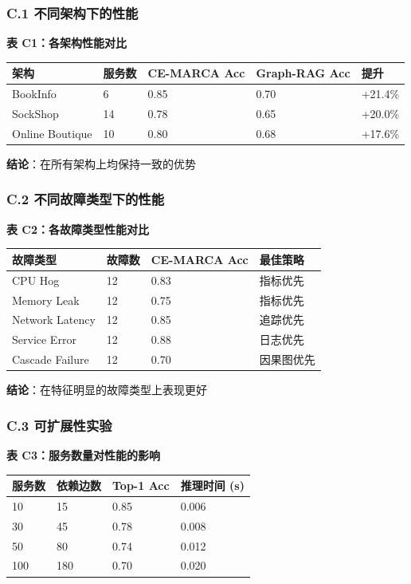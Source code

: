 \hypertarget{c.1-ux4e0dux540cux67b6ux6784ux4e0bux7684ux6027ux80fd}{%
\subsubsection{C.1
不同架构下的性能}\label{c.1-ux4e0dux540cux67b6ux6784ux4e0bux7684ux6027ux80fd}}

\textbf{表 C1：各架构性能对比}

\begin{longtable}[]{@{}lllll@{}}
\toprule
架构 & 服务数 & CE-MARCA Acc & Graph-RAG Acc & 提升\tabularnewline
\midrule
\endhead
BookInfo & 6 & 0.85 & 0.70 & +21.4\%\tabularnewline
SockShop & 14 & 0.78 & 0.65 & +20.0\%\tabularnewline
Online Boutique & 10 & 0.80 & 0.68 & +17.6\%\tabularnewline
\bottomrule
\end{longtable}

\textbf{结论}：在所有架构上均保持一致的优势

\hypertarget{c.2-ux4e0dux540cux6545ux969cux7c7bux578bux4e0bux7684ux6027ux80fd}{%
\subsubsection{C.2
不同故障类型下的性能}\label{c.2-ux4e0dux540cux6545ux969cux7c7bux578bux4e0bux7684ux6027ux80fd}}

\textbf{表 C2：各故障类型性能对比}

\begin{longtable}[]{@{}llll@{}}
\toprule
故障类型 & 故障数 & CE-MARCA Acc & 最佳策略\tabularnewline
\midrule
\endhead
CPU Hog & 12 & 0.83 & 指标优先\tabularnewline
Memory Leak & 12 & 0.75 & 指标优先\tabularnewline
Network Latency & 12 & 0.85 & 追踪优先\tabularnewline
Service Error & 12 & 0.88 & 日志优先\tabularnewline
Cascade Failure & 12 & 0.70 & 因果图优先\tabularnewline
\bottomrule
\end{longtable}

\textbf{结论}：在特征明显的故障类型上表现更好

\hypertarget{c.3-ux53efux6269ux5c55ux6027ux5b9eux9a8c}{%
\subsubsection{C.3
可扩展性实验}\label{c.3-ux53efux6269ux5c55ux6027ux5b9eux9a8c}}

\textbf{表 C3：服务数量对性能的影响}

\begin{longtable}[]{@{}llll@{}}
\toprule
服务数 & 依赖边数 & Top-1 Acc & 推理时间 (s)\tabularnewline
\midrule
\endhead
10 & 15 & 0.85 & 0.006\tabularnewline
30 & 45 & 0.78 & 0.008\tabularnewline
50 & 80 & 0.74 & 0.012\tabularnewline
100 & 180 & 0.70 & 0.020\tabularnewline
\bottomrule
\end{longtable}

